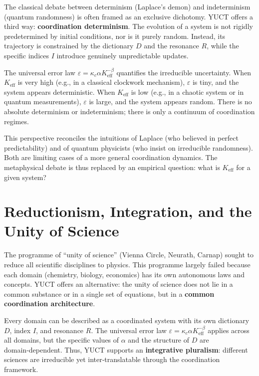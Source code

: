 \documentclass[12pt,a4paper]{article}
\begin{document}
	The classical debate between determinism (Laplace’s demon) and indeterminism (quantum randomness) is often framed as an exclusive dichotomy. YUCT offers a third way: \textbf{coordination determinism}. The evolution of a system is not rigidly predetermined by initial conditions, nor is it purely random. Instead, its trajectory is constrained by the dictionary \(D\) and the resonance \(R\), while the specific indices \(I\) introduce genuinely unpredictable updates.
	
	The universal error law \(\varepsilon = \kappa_c \alpha K_{\mathrm{eff}}^{-\beta}\) quantifies the irreducible uncertainty. When \(K_{\mathrm{eff}}\) is very high (e.g., in a classical clockwork mechanism), \(\varepsilon\) is tiny, and the system appears deterministic. When \(K_{\mathrm{eff}}\) is low (e.g., in a chaotic system or in quantum measurements), \(\varepsilon\) is large, and the system appears random. There is no absolute determinism or indeterminism; there is only a continuum of coordination regimes.
	
	This perspective reconciles the intuitions of Laplace (who believed in perfect predictability) and of quantum physicists (who insist on irreducible randomness). Both are limiting cases of a more general coordination dynamics. The metaphysical debate is thus replaced by an empirical question: what is \(K_{\mathrm{eff}}\) for a given system?
	
	\section{Reductionism, Integration, and the Unity of Science}
	
	The programme of “unity of science” (Vienna Circle, Neurath, Carnap) sought to reduce all scientific disciplines to physics. This programme largely failed because each domain (chemistry, biology, economics) has its own autonomous laws and concepts. YUCT offers an alternative: the unity of science does not lie in a common substance or in a single set of equations, but in a \textbf{common coordination architecture}.
	
	Every domain can be described as a coordinated system with its own dictionary \(D\), index \(I\), and resonance \(R\). The universal error law \(\varepsilon = \kappa_c \alpha K_{\mathrm{eff}}^{-\beta}\) applies across all domains, but the specific values of \(\alpha\) and the structure of \(D\) are domain‑dependent. Thus, YUCT supports an \textbf{integrative pluralism}: different sciences are irreducible yet inter‑translatable through the coordination framework.
	
\end{document}
